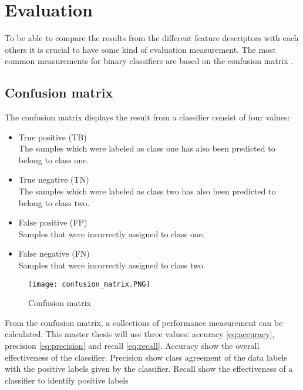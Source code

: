 \section{Evaluation}

To be able to compare the results from the different feature descriptors with each others it is crucial to have some kind of evaluation measurement. The most common measurements for binary classifiers are based on the confusion matrix \cite{sokolova2009systematic}. 

\subsection{Confusion matrix}

The confusion matrix displays the result from a classifier consist of four values:

\begin{itemize}
	\item True positive (TB)\\
	The samples which were labeled as class one has also been predicted to belong to class one.
	
	\item True negative (TN)\\
	The samples which were labeled as class two has also been predicted to belong to class two.
	
	\item False positive (FP)\\
	Samples that were incorrectly assigned to class one.
	
	\item False negative (FN)\\
	Samples that were incorrectly assigned to class two.
\end{itemize}

\FloatBarrier
\begin{figure}[!h]
	\centering
	\texttt{[image: confusion\_matrix.PNG]}
	\caption{Confusion matrix
		\label{fig:confusion}}
\end{figure} 
\FloatBarrier

From the confusion matrix, a collections of performance measurement can be calculated. This master thesis will use three values: accuracy \cref{eq:accuracy}, precision \cref{eq:precision} and recall \cref{eq:recall}. Accuracy show the overall effectiveness of the classifier. Precision show class agreement of the data labels with the positive labels given by the classifier. Recall show the effectiveness of a classifier to identify positive labels

